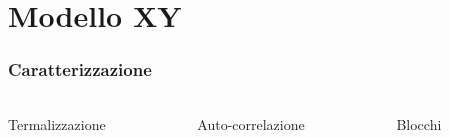 \section{Modello XY}

\begin{frame}
    \frametitle{Caratterizzazione}
    \framesubtitle{}

    \begin{columns}
        \begin{column}{0.33\textwidth}
            \begin{block}{Termalizzazione}
            
            \end{block}
        \end{column}
    
        \begin{column}{0.33\textwidth}
            \begin{block}{Auto-correlazione}
            
            \end{block}
        \end{column}

        \begin{column}{0.33\textwidth}
            \begin{block}{Blocchi}

            \end{block}        
        \end{column}
    \end{columns}
\end{frame}



